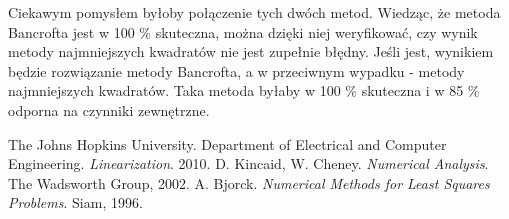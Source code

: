 \documentclass{article}
\begin{document}
Ciekawym pomysłem byłoby połączenie tych dwóch metod. Wiedząc, że metoda Bancrofta jest w 100 \% skuteczna, można dzięki niej weryfikować, czy wynik metody najmniejszych kwadratów nie jest zupełnie błędny. Jeśli jest, wynikiem będzie rozwiązanie metody Bancrofta, a w przeciwnym wypadku - metody najmniejszych kwadratów. Taka metoda byłaby w 100 \% skuteczna i w 85 \% odporna na czynniki zewnętrzne.


\begin{thebibliography}{100}
 The Johns Hopkins University. Department of Electrical and Computer Engineering. \emph{Linearization}. 2010.
 D. Kincaid, W. Cheney. \emph{Numerical Analysis}. The Wadsworth Group, 2002.
 A. Bjorck. \emph{Numerical Methods for Least Squares Problems}. Siam, 1996.
\end{thebibliography}
\end{document}
